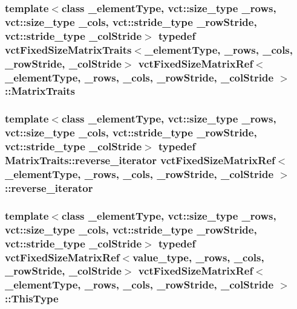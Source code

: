 \subsubsection[{Matrix\+Traits}]{\setlength{\rightskip}{0pt plus 5cm}template$<$class \+\_\+element\+Type, vct\+::size\+\_\+type \+\_\+rows, vct\+::size\+\_\+type \+\_\+cols, vct\+::stride\+\_\+type \+\_\+row\+Stride, vct\+::stride\+\_\+type \+\_\+col\+Stride$>$ typedef {\bf vct\+Fixed\+Size\+Matrix\+Traits}$<$\+\_\+element\+Type, \+\_\+rows, \+\_\+cols, \+\_\+row\+Stride, \+\_\+col\+Stride$>$ {\bf vct\+Fixed\+Size\+Matrix\+Ref}$<$ \+\_\+element\+Type, \+\_\+rows, \+\_\+cols, \+\_\+row\+Stride, \+\_\+col\+Stride $>$\+::{\bf Matrix\+Traits}}\label{classvct_fixed_size_matrix_ref_a9716291cd710aec62841490659e783da}
\hypertarget{classvct_fixed_size_matrix_ref_a052eeff62ac55a54af1179c7fd8d246f}{}
\subsubsection[{reverse\+\_\+iterator}]{\setlength{\rightskip}{0pt plus 5cm}template$<$class \+\_\+element\+Type, vct\+::size\+\_\+type \+\_\+rows, vct\+::size\+\_\+type \+\_\+cols, vct\+::stride\+\_\+type \+\_\+row\+Stride, vct\+::stride\+\_\+type \+\_\+col\+Stride$>$ typedef {\bf Matrix\+Traits\+::reverse\+\_\+iterator} {\bf vct\+Fixed\+Size\+Matrix\+Ref}$<$ \+\_\+element\+Type, \+\_\+rows, \+\_\+cols, \+\_\+row\+Stride, \+\_\+col\+Stride $>$\+::{\bf reverse\+\_\+iterator}}\label{classvct_fixed_size_matrix_ref_a052eeff62ac55a54af1179c7fd8d246f}
\hypertarget{classvct_fixed_size_matrix_ref_a29a621c8e22f250f9033e539ad219f95}{}
\subsubsection[{This\+Type}]{\setlength{\rightskip}{0pt plus 5cm}template$<$class \+\_\+element\+Type, vct\+::size\+\_\+type \+\_\+rows, vct\+::size\+\_\+type \+\_\+cols, vct\+::stride\+\_\+type \+\_\+row\+Stride, vct\+::stride\+\_\+type \+\_\+col\+Stride$>$ typedef {\bf vct\+Fixed\+Size\+Matrix\+Ref}$<$value\+\_\+type, \+\_\+rows, \+\_\+cols, \+\_\+row\+Stride, \+\_\+col\+Stride$>$ {\bf vct\+Fixed\+Size\+Matrix\+Ref}$<$ \+\_\+element\+Type, \+\_\+rows, \+\_\+cols, \+\_\+row\+Stride, \+\_\+col\+Stride $>$\+::{\bf This\+Type}}\label{classvct_fixed_size_matrix_ref_a29a621c8e22f250f9033e539ad219f95}


